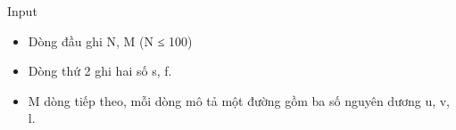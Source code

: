 Input
\begin{itemize}
	\item Dòng đầu ghi N, M (N ≤ 100)
	\item Dòng thứ 2 ghi hai số s, f.
	\item M dòng tiếp theo, mỗi dòng mô tả một đường gồm ba số nguyên dương u, v, l.
\end{itemize}